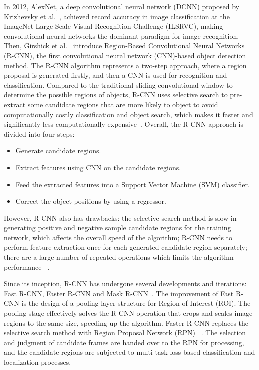 In 2012, AlexNet, a deep convolutional neural network (DCNN) proposed by Krizhevsky et al.~\cite{krizhevsky2012imagenet}, achieved record accuracy in image classification at the ImageNet Large-Scale Visual Recognition Challenge (ILSRVC), making convolutional neural networks the dominant paradigm for image recognition. Then, Girshick et al.~\cite{girshick2014rich} introduce Region-Based Convolutional Neural Networks (R-CNN), the first convolutional neural network (CNN)-based object detection method. The R-CNN algorithm represents a two-step approach, where a region proposal is generated firstly, and then a CNN is used for recognition and classification. Compared to the traditional sliding convolutional window to determine the possible regions of objects, R-CNN uses selective search to pre-extract some candidate regions that are more likely to object to avoid computationally costly classification and object search, which makes it faster and significantly less computationally expensive~\cite{ uijlings2013selective, girshick2014rich}. Overall, the R-CNN approach is divided into four steps:

\begin{itemize}
    \item Generate candidate regions.
    \item Extract features using CNN on the candidate regions.
    \item Feed the extracted features into a Support Vector Machine (SVM) classifier.
    \item Correct the object positions by using a regressor.
\end{itemize}

However, R-CNN also has drawbacks: the selective search method is slow in generating positive and negative sample candidate regions for the training network, which affects the overall speed of the algorithm; R-CNN needs to perform feature extraction once for each generated candidate region separately; there are a large number of repeated operations which limits the algorithm performance ~\cite{huang2017speed}.

Since its inception, R-CNN has undergone several developments and iterations: Fast R-CNN, Faster R-CNN and Mask R-CNN~\cite{girshick2015fast, ren2015faster, he2017mask}. The improvement of Fast R-CNN is the design of a pooling layer structure for Region of Interest (ROI). The pooling stage effectively solves the R-CNN operation that crops and scales image regions to the same size, speeding up the algorithm. Faster R-CNN replaces the selective search method with Region Proposal Network (RPN) ~\cite{ren2015faster}. The selection and judgment of candidate frames are handed over to the RPN for processing, and the candidate regions are subjected to multi-task loss-based classification and localization processes. 

